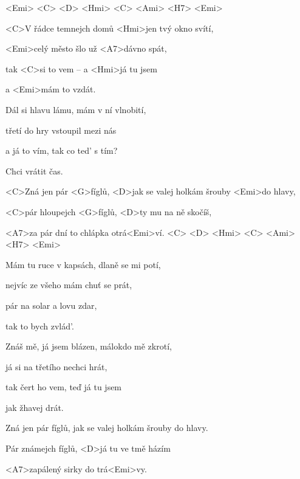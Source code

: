 

<Emi> <C> <D> <Hmi> <C> <Ami> <H7> <Emi>

\zs
<C>V řádce temnejch domů <Hmi>jen tvý okno svítí,

<Emi>celý město šlo už <A7>dávno spát,

tak <C>si to vem -- a <Hmi>já tu jsem

a <Emi>mám to vzdát.
\ks

\zs
Dál si hlavu lámu, mám v ní vlnobití,

třetí do hry vstoupil mezi nás

a já to vím, tak co ted’ s tím?

Chci vrátit čas.
\ks

\zr
<C>Zná jen pár <G>fíglů,
<D>jak se valej holkám šrouby <Emi>do hlavy,

<C>pár hloupejch <G>fíglů,
<D>ty mu na ně skočíš,

<A7>za pár dní to chlápka otrá<Emi>ví.
<C> <D> <Hmi> <C> <Ami> <H7> <Emi>
\kr

\zs
Mám tu ruce v kapsách, dlaně se mi potí,

nejvíc ze všeho mám chuť se prát,

pár na solar a lovu zdar,

tak to bych zvlád'.
\ks

\zs
Znáš mě, já jsem blázen, málokdo mě zkrotí,

já si na třetího nechci hrát,

tak čert ho vem, teď já tu jsem

jak žhavej drát.
\ks

\zr \kr

\zr
Zná jen pár fíglů,
jak se valej holkám šrouby do hlavy.

Pár známejch fíglů,
<D>já tu ve tmě házím

<A7>zapálený sirky do trá<Emi>vy.
\kr

\kp
